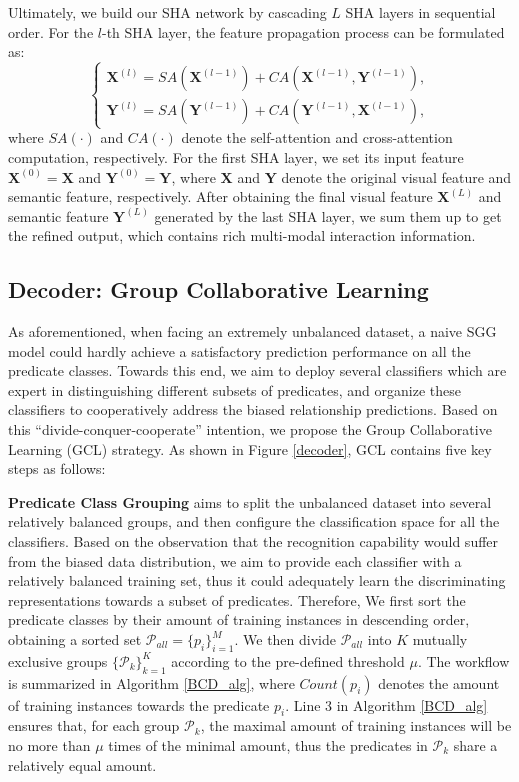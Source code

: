 \documentclass[10pt,twocolumn,letterpaper]{article}
\begin{document}
Ultimately, we build our SHA network by cascading $L$ SHA layers in sequential order. For the $l$-th SHA layer, the feature propagation process can be formulated as:
\begin{equation}
    \left \{
    \begin{aligned}
	\mathbf{X}^{(l)} = SA(\mathbf{X}^{(l-1)}) + CA(\mathbf{X}^{(l-1)}, \mathbf{Y}^{(l-1)}),
	\\
	\mathbf{Y}^{(l)} = SA(\mathbf{Y}^{(l-1)}) + CA(\mathbf{Y}^{(l-1)}, \mathbf{X}^{(l-1)}),
	\end{aligned}
	\right.
\end{equation}
where $SA(\cdot)$ and $CA(\cdot)$ denote the self-attention and cross-attention computation, respectively. For the first SHA layer, we set its input feature $\mathbf{X}^{(0)} = \mathbf{X}$ and $\mathbf{Y}^{(0)} = \mathbf{Y}$, where $\mathbf{X}$ and $\mathbf{Y}$ denote the original visual feature and semantic feature, respectively. After obtaining the final visual feature $\mathbf{X}^{(L)}$ and semantic feature $\mathbf{Y}^{(L)}$ generated by the last SHA layer, we sum them up to get the refined output, which contains rich multi-modal interaction information.


\subsection{Decoder: Group Collaborative Learning}
\label{Sec34}

As aforementioned, when facing an extremely unbalanced dataset, a naive SGG model could hardly achieve a satisfactory prediction performance on all the predicate classes. Towards this end, we aim to deploy several classifiers which are expert in distinguishing different subsets of predicates, and organize these classifiers to cooperatively address the biased relationship predictions. Based on this ``divide-conquer-cooperate'' intention, we propose the Group Collaborative Learning (GCL) strategy. As shown in Figure \ref{decoder}, GCL contains five key steps as follows:


\textbf{Predicate Class Grouping} aims to split the unbalanced dataset into several relatively balanced groups, and then configure the classification space for all the classifiers. Based on the observation that the recognition capability would suffer from the biased data distribution, we aim to provide each classifier with a relatively balanced training set, thus it could adequately learn the discriminating representations towards a subset of predicates. Therefore, We first sort the predicate classes by their amount of training instances in descending order, obtaining a sorted set $\mathcal{P}_{all}=\{p_{i}\}_{i=1}^M$. We then divide $ \mathcal{P}_{all}$ into $K$ mutually exclusive groups $\{\mathcal{P}_{k}\}_{k=1}^K $ according to the pre-defined threshold $\mu$. The workflow is summarized in Algorithm \ref{BCD_alg}, where $Count({p}_{i})$ denotes the amount of training instances towards the predicate $p_{i}$. Line 3 in Algorithm \ref{BCD_alg} ensures that, for each group $\mathcal{P}_{k}$, the maximal amount of training instances will be no more than $\mu$ times of the minimal amount, thus the predicates in $\mathcal{P}_{k}$ share a relatively equal amount.
\end{document}
